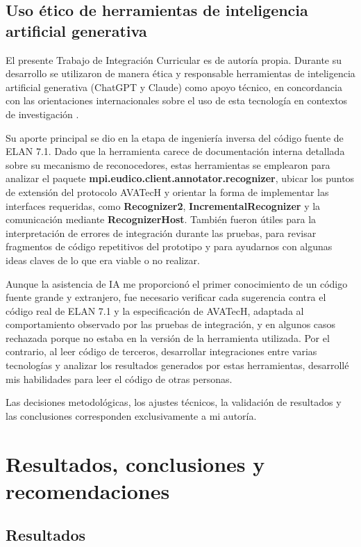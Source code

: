\documentclass[11pt,a4paper]{article}
\begin{document}
\subsection{Uso ético de herramientas de inteligencia artificial generativa}

El presente Trabajo de Integración Curricular es de autoría propia. Durante su desarrollo se utilizaron de manera ética y responsable herramientas de inteligencia artificial generativa (ChatGPT y Claude) como apoyo técnico, en concordancia con las orientaciones internacionales sobre el uso de esta tecnología en contextos de investigación \cite{unesco2023guidance}.

Su aporte principal se dio en la etapa de ingeniería inversa del código fuente de ELAN 7.1. Dado que la herramienta carece de documentación interna detallada sobre su mecanismo de reconocedores, estas herramientas se emplearon para analizar el paquete \textbf{mpi.eudico.client.annotator.recognizer}, ubicar los puntos de extensión del protocolo AVATecH y orientar la forma de implementar las interfaces requeridas, como \textbf{Recognizer2}, \textbf{IncrementalRecognizer} y la comunicación mediante \textbf{RecognizerHost}. También fueron útiles para la interpretación de errores de integración durante las pruebas, para revisar fragmentos de código repetitivos del prototipo y para ayudarnos con algunas ideas claves de lo que era viable o no realizar.

Aunque la asistencia de IA me proporcionó el primer conocimiento de un código fuente grande y extranjero, fue necesario verificar cada sugerencia contra el código real de ELAN 7.1 y la especificación de AVATecH, adaptada al comportamiento observado por las pruebas de integración, y en algunos casos rechazada porque no estaba en la versión de la herramienta utilizada. Por el contrario, al leer código de terceros, desarrollar integraciones entre varias tecnologías y analizar los resultados generados por estas herramientas, desarrollé mis habilidades para leer el código de otras personas.

Las decisiones metodológicas, los ajustes técnicos, la validación de resultados y las conclusiones corresponden exclusivamente a mi autoría.


\section[RESULTADOS, CONCLUSIONES Y RECOMENDACIONES]{Resultados, conclusiones y recomendaciones}

\subsection{Resultados}
\end{document}
